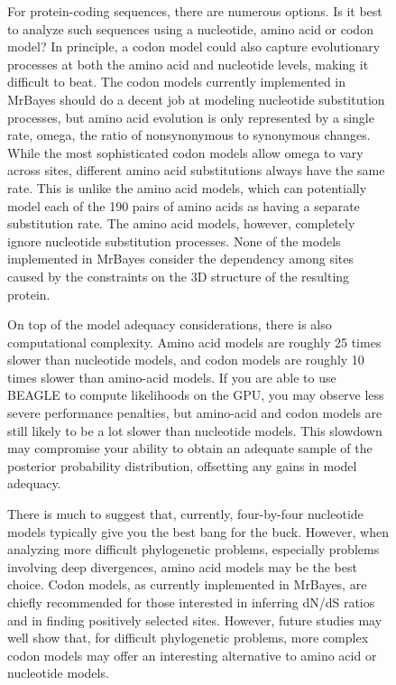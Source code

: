 \documentclass[12pt]{book}
\begin{document}
\begin{figure}[h]
For protein-coding sequences, there are numerous options. Is it best to analyze such sequences
using a nucleotide, amino acid or codon model? In principle, a codon model could also capture
evolutionary processes at both the amino acid and nucleotide levels, making it difficult to beat.
The codon models currently implemented in MrBayes should do a decent job at modeling nucleotide
substitution processes, but amino acid evolution is only represented by a single rate, omega, the
ratio of nonsynonymous to synonymous changes. While the most sophisticated codon models allow omega
to vary across sites, different amino acid substitutions always have the same rate. This is unlike
the amino acid models, which can potentially model each of the 190 pairs of amino acids as having a
separate substitution rate. The amino acid models, however, completely ignore nucleotide
substitution processes. None of the models implemented in MrBayes consider the dependency among
sites caused by the constraints on the 3D structure of the resulting protein.

On top of the model adequacy considerations, there is also computational complexity. Amino acid
models are roughly 25 times slower than nucleotide models, and codon models are roughly 10 times
slower than amino-acid models. If you are able to use BEAGLE to compute likelihoods on the GPU, you
may observe less severe performance penalties, but amino-acid and codon models are still likely to
be a lot slower than nucleotide models. This slowdown may compromise your ability to obtain an
adequate sample of the posterior probability distribution, offsetting any gains in model adequacy.

There is much to suggest that, currently, four-by-four nucleotide models typically give you the
best bang for the buck. However, when analyzing more difficult phylogenetic problems, especially
problems involving deep divergences, amino acid models may be the best choice. Codon models, as
currently implemented in MrBayes, are chiefly recommended for those interested in inferring dN/dS
ratios and in finding positively selected sites. However, future studies may well show that, for
difficult phylogenetic problems, more complex codon models may offer an interesting alternative to
amino acid or nucleotide models.


\end{figure}
\end{document}
